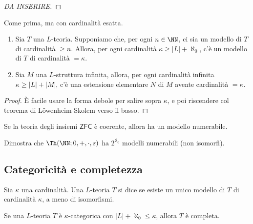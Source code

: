 \begin{proof}
    [DA INSERIRE]
\end{proof}

\begin{theorem}
    Come prima, ma con cardinalità esatta.
    \begin{enumerate}
        \item Sia $T$ una $L$-teoria. Supponiamo che, per ogni $n \in \NN$, ci sia un modello di $T$ di cardinalità $\geq n$. Allora, per ogni cardinalità $\kappa \geq |L| + \aleph_0$, c'è un modello di $T$ di cardinalità $= \kappa$.
        \item Sia $M$ una $L$-struttura infinita, allora, per ogni cardinalità infinita $\kappa \geq |L| + |M|$, c'è una estensione elementare $N$ di $M$ avente cardinalità $= \kappa$.
    \end{enumerate}
\end{theorem}

\begin{proof}
    È facile usare la forma debole per salire sopra $\kappa$, e poi riscendere col teorema di Löwenheim-Skolem verso il basso.
\end{proof}

\begin{exercise}
    Se la teoria degli insiemi $\mathsf{ZFC}$ è coerente, allora ha un modello numerabile.
\end{exercise}

\begin{exercise}
    Dimostra che $\Th(\NN; 0, + , \cdot, s)$ ha $2^{\aleph_0}$ modelli numerabili (non isomorfi).
\end{exercise}

\subsection{Categoricità e completezza}

\begin{definition}[Categoricità]
    Sia $\kappa $ una cardinalità. Una $L$-teoria $T$ si dice  se esiste un unico modello di $T$ di cardinalità $\kappa$, a meno di isomorfismi.
\end{definition}

\begin{proposition}
    Se una $L$-teoria $T$ è $\kappa$-categorica con $|L| + \aleph_0 \leq \kappa$, allora $T$ è completa.
\end{proposition}

